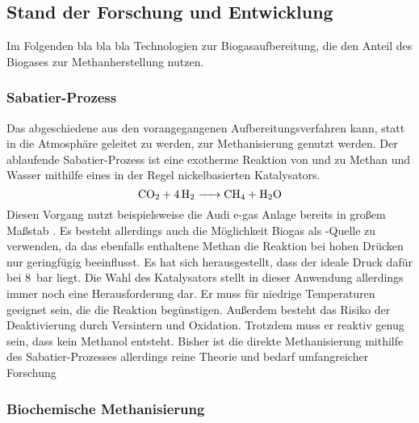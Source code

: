 \subsection{Stand der Forschung und Entwicklung}

Im Folgenden bla bla bla Technologien zur Biogasaufbereitung, die den  Anteil des Biogases zur Methanherstellung nutzen.

\subsubsection{Sabatier-Prozess}\label{chap:Sabatier}

Das abgeschiedene  aus den vorangegangenen Aufbereitungsverfahren kann, statt in die Atmosphäre geleitet zu werden, zur Methanisierung genutzt werden. Der ablaufende Sabatier-Prozess ist eine exotherme Reaktion von  und  zu Methan und Wasser mithilfe eines in der Regel nickelbasierten Katalysators. \parencite{AONC2019} 
\begin{equation}
	\ce{CO2 + 4H2 -> CH4 + H2O}
\end{equation}
Diesen Vorgang nutzt beispielsweise die Audi e-gas Anlage bereits in großem Maßstab \parencite{audi13}. \parencite{AONC2019} \newline
Es besteht allerdings auch die Möglichkeit Biogas als -Quelle zu verwenden, da das ebenfalls enthaltene Methan die Reaktion bei hohen Drücken nur geringfügig beeinflusst. Es hat sich herausgestellt, dass der ideale Druck dafür bei \SI{8}{\bar} liegt. Die Wahl des Katalysators stellt in dieser Anwendung allerdings immer noch eine Herausforderung dar. Er muss für niedrige Temperaturen geeignet sein, die die Reaktion begünstigen. Außerdem besteht das Risiko der Deaktivierung durch Versintern und Oxidation. Trotzdem muss er reaktiv genug sein, dass kein Methanol entsteht. Bisher ist die direkte Methanisierung mithilfe des Sabatier-Prozesses allerdings reine Theorie und bedarf umfangreicher Forschung 
\parencite{AONC2019}


\subsubsection{Biochemische Methanisierung}\label{chap:biochem} 

